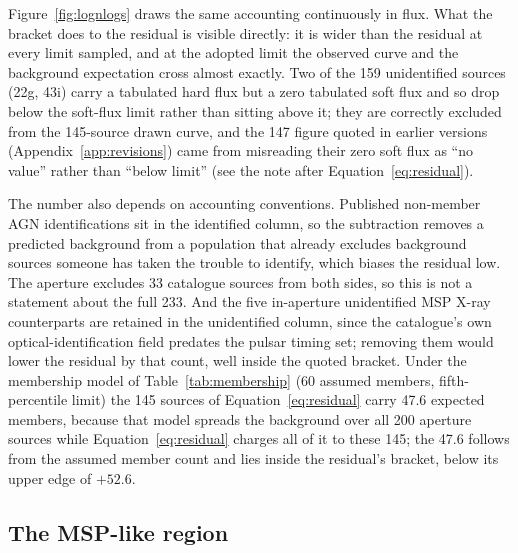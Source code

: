 \documentclass[11pt]{article}
\begin{document}
Figure~\ref{fig:lognlogs} draws the same accounting continuously in flux. What the
bracket does to the residual is visible directly: it is wider than the residual at
every limit sampled, and at the adopted limit the observed curve and the background
expectation cross almost exactly. Two of the 159 unidentified sources (22g, 43i)
carry a tabulated hard flux but a zero tabulated soft flux and so drop below the
soft-flux limit rather than sitting above it; they are correctly excluded from the
145-source drawn curve, and the 147 figure quoted in earlier versions (Appendix~\ref{app:revisions})
came from misreading their zero soft flux as ``no value'' rather than ``below
limit'' (see the note after Equation~\eqref{eq:residual}).

The number also depends on accounting conventions. Published non-member AGN identifications sit in the identified column, so the subtraction removes a predicted background from a population that already excludes background sources someone has taken the trouble to identify, which biases the residual low. The aperture excludes 33 catalogue sources from both sides, so this is not a statement about the full 233. And the five in-aperture unidentified MSP X-ray counterparts are retained in the unidentified column, since the catalogue's own optical-identification field predates the pulsar timing set; removing them would lower the residual by that count, well inside the quoted bracket. Under the membership model of Table~\ref{tab:membership} (60 assumed members, fifth-percentile limit) the 145 sources of Equation~\eqref{eq:residual} carry 47.6 expected members, because that model spreads the background over all 200 aperture sources while Equation~\eqref{eq:residual} charges all of it to these 145; the 47.6 follows from the assumed member count and lies inside the residual's bracket, below its upper edge of $+52.6$.

\subsection{The MSP-like region}
\label{sec:results-msplike}
\end{document}
